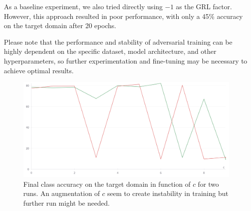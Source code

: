 As a baseline experiment, we also tried directly using $-1$ as the GRL factor. However, this approach resulted in poor performance, with only a 45\% accuracy on the target domain after 20 epochs.

Please note that the performance and stability of adversarial training can be highly dependent on the specific dataset, model architecture, and other hyperparameters, so further experimentation and fine-tuning may be necessary to achieve optimal results.

\begin{figure}[H]
    \centering
    \includegraphics[width=.8\textwidth]{GLR_factor_exp.png}
    \caption{Final class accuracy on the target domain in function of $c$ for two runs. An augmentation of $c$ seem to create instability in training but further run might be needed.}
    \label{fig:glr}
\end{figure}







